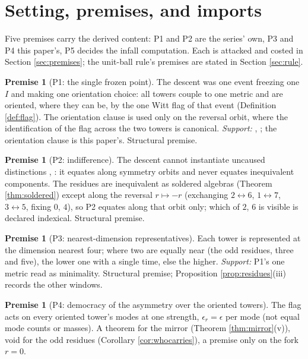 \documentclass[11pt]{article}
\theoremstyle{definition}
\newtheorem{premise}[theorem]{Premise}
\let\oldsection\section
\renewcommand{\section}{\clearpage\oldsection}   %
\begin{document}
\section{Setting, premises, and imports}\label{sec:setting}

Five premises carry the derived content: P1 and P2 are the series' own, P3 and P4 this paper's, P5 decides the infall computation. Each is attacked and costed in Section \ref{sec:premises}; the unit-ball rule's premises are stated in Section \ref{sec:rule}.

\begin{premise}[P1: the single frozen point]\label{prem:single}
The descent was one event freezing one $I$ and making one orientation choice: all towers couple to one metric and are oriented, where they can be, by the one Witt flag of that event (Definition \ref{def:flag}). The orientation clause is used only on the reversal orbit, where the identification of the flag across the two towers is canonical. \emph{Support:} \cite[Thm.~4.7]{ButlerT6}, \cite[Obs.~7.4]{ButlerT12}; the orientation clause is this paper's. Structural premise.
\end{premise}

\begin{premise}[P2: indifference]\label{prem:indiff}
The descent cannot instantiate uncaused distinctions \cite[Principle~5.4]{ButlerT8}, \cite[\S2]{ButlerT13}: it equates along symmetry orbits and never equates inequivalent components. The residues are inequivalent as soldered algebras (Theorem \ref{thm:soldered}) except along the reversal $r \mapsto -r$ (exchanging $2 \leftrightarrow 6$, $1 \leftrightarrow 7$, $3 \leftrightarrow 5$, fixing $0$, $4$), so P2 equates along that orbit only; which of $2$, $6$ is visible is declared indexical. Structural premise.
\end{premise}

\begin{premise}[P3: nearest-dimension representatives]\label{prem:window}
Each tower is represented at the dimension nearest four; where two are equally near (the odd residues, three and five), the lower one with a single time, else the higher. \emph{Support:} P1's one metric read as minimality. Structural premise; Proposition \ref{prop:residues}(iii) records the other windows.
\end{premise}

\begin{premise}[P4: democracy of the asymmetry over the oriented towers]\label{prem:democracy}
The flag acts on every oriented tower's modes at one strength, $\epsilon_{r} = \epsilon$ per mode (not equal mode counts or masses). A theorem for the mirror (Theorem \ref{thm:mirror}(v)), void for the odd residues (Corollary \ref{cor:whocarries}), a premise only on the fork $r = 0$.
\end{premise}
\end{document}

